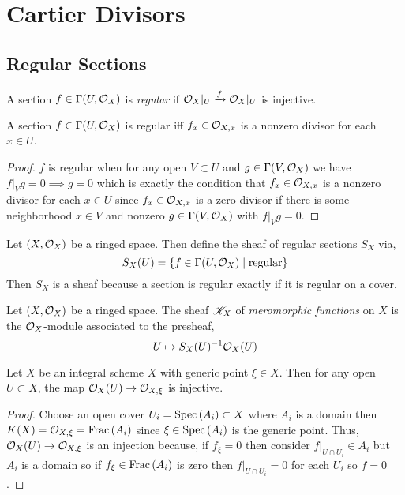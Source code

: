 \documentclass[12pt]{article}
\begin{document}
\section{Cartier Divisors}

\subsection{Regular Sections}

\begin{definition}
A section $f \in \Gamma(U, \mathcal{O}_{X})$ is \textit{regular} if $\mathcal{O}_{X}|_U \xrightarrow{f} \mathcal{O}_{X}|_U$ is injective.
\end{definition}

\begin{lemma}
A section $f \in \Gamma(U, \mathcal{O}_{X})$ is regular iff $f_x \in \mathcal{O}_{X, x}$ is a nonzero divisor for each $x \in U$.
\end{lemma}

\begin{proof}
$f$ is regular when for any open $V \subset U$ and $g \in \Gamma(V, \mathcal{O}_{X})$ we have $f|_V g = 0 \implies g = 0$ which is exactly the condition that $f_x \in \mathcal{O}_{X, x}$ is a nonzero divisor for each $x \in U$ since $f_x \in \mathcal{O}_{X, x}$ is a zero divisor if there is some neighborhood $x \in V$ and nonzero $g \in \Gamma(V, \mathcal{O}_{X})$ with $f|_V g = 0$. 
\end{proof}

\begin{definition}
Let $(X, \mathcal{O}_{X})$ be a ringed space. Then define the sheaf of regular sections $S_X$ via, 
\[ S_X(U) = \{ f \in \Gamma(U, \mathcal{O}_{X}) \mid \text{regular} \} \]
Then $S_X$ is a sheaf because a section is regular exactly if it is regular on a cover.
\end{definition}

\begin{definition}
Let $(X, \mathcal{O}_{X})$ be a ringed space. The sheaf $\mathscr{K}_X$ of \textit{meromorphic functions} on $X$ is the $\mathcal{O}_{X}$-module associated to the presheaf,
\[ U \mapsto S_X(U)^{-1} \mathcal{O}_{X}(U) \]
\end{definition}

\begin{lemma}
Let $X$ be an integral scheme $X$ with generic point $\xi \in X$. Then for any open $U \subset X$, the map $\mathcal{O}_{X}(U) \to \mathcal{O}_{X, \xi}$ is injective.
\end{lemma}

\begin{proof}
Choose an open cover $U_i = \mathrm{Spec}\left( A_i \right) \subset X$ where $A_i$ is a domain then $K(X) = \mathcal{O}_{X, \xi} = \mathrm{Frac}\left(A_i\right)$ since $\xi \in \mathrm{Spec}\left( A_i \right)$ is the generic point. Thus, $\mathcal{O}_{X}(U) \to \mathcal{O}_{X, \xi}$ is an injection because, if $f_\xi = 0$ then consider $f|_{U \cap U_i} \in A_i$ but $A_i$ is a domain so if $f_\xi \in \mathrm{Frac}\left(A_i\right)$ is zero then $f|_{U \cap U_i} = 0$ for each $U_i$ so $f = 0$. 
\end{proof}
\end{document}
